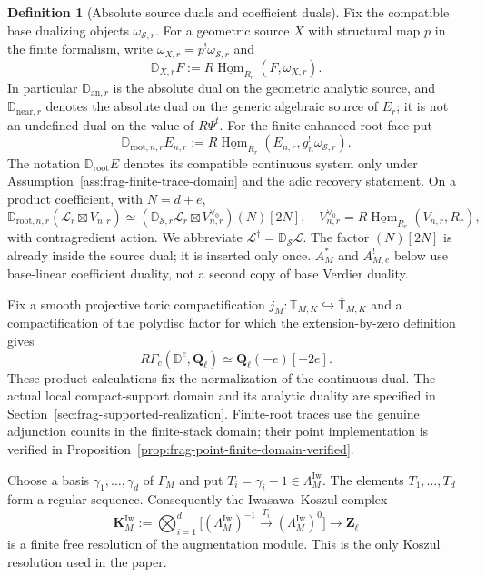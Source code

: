 \documentclass[11pt]{article}
\theoremstyle{definition}
\newtheorem{definition}[theorem]{Definition}
\theoremstyle{remark}
\begin{document}
\begin{definition}[Absolute source duals and coefficient duals]
\label{def:frag-source-duality-ledger}
Fix the compatible base dualizing objects $\omega_{\mathscr S,r}$.
For a geometric source $X$ with structural map $p$ in the finite formalism,
write $\omega_{X,r}=p^!\omega_{\mathscr S,r}$ and
\[
\mathbb D_{X,r}F:=R\underline{\operatorname{Hom}}_{R_r}
(F,\omega_{X,r}).
\]
In particular $\mathbb D_{\mathrm{an},r}$ is the absolute dual on the
geometric analytic source, and $\mathbb D_{\mathrm{near},r}$ denotes the
absolute dual on the generic algebraic source of $E_r$; it is not an
undefined dual on the value of $R\Psi^t$.
For the finite enhanced root face put
\[
\mathbb D_{\mathrm{root},n,r}E_{n,r}
:=R\underline{\operatorname{Hom}}_{R_r}
(E_{n,r},g_n^!\omega_{\mathscr S,r}).
\]
The notation $\mathbb D_{\mathrm{root}}E$ denotes its compatible continuous
system only under Assumption~\ref{ass:frag-finite-trace-domain} and the adic
recovery statement.  On a product coefficient, with $N=d+e$,
\[
\mathbb D_{\mathrm{root},n,r}(\mathcal L_r\boxtimes V_{n,r})
\simeq (\mathbb D_{\mathscr S,r}\mathcal L_r\boxtimes
V_{n,r}^{\vee_0})(N)[2N],
\quad V_{n,r}^{\vee_0}=R\underline{\operatorname{Hom}}_{R_r}(V_{n,r},R_r),
\]
with contragredient action.  We abbreviate
$\mathcal L^\dagger=\mathbb D_{\mathscr S}\mathcal L$.
The factor $(N)[2N]$ is already inside the source dual; it is inserted only
once.  $A_M^*$ and $A_{M,e}^!$ below use base-linear coefficient duality,
not a second copy of base Verdier duality.
\end{definition}


Fix a smooth projective toric compactification
$j_M:\mathbb T_{M,K}\hookrightarrow\overline{\mathbb T}_{M,K}$ and a
compactification of the polydisc factor for which the extension-by-zero
definition gives
\[
 R\Gamma_c(\mathbb D^e,\mathbf Q_\ell)
 \simeq \mathbf Q_\ell(-e)[-2e].
\]
These product calculations fix the normalization of the continuous dual.
The actual local compact-support domain and its analytic duality are
specified in Section~\ref{sec:frag-supported-realization}.  Finite-root
traces use the genuine adjunction counits in the finite-stack domain;
their point implementation is verified in
Proposition~\ref{prop:frag-point-finite-domain-verified}.

Choose a basis $\gamma_1,\ldots,\gamma_d$ of $\Gamma_M$ and put
$T_i=\gamma_i-1\in\Lambda_M^{\mathrm{Iw}}$.  The elements
$T_1,\ldots,T_d$ form a regular sequence.  Consequently the Iwasawa--Koszul
complex
\begin{equation}
 \mathbf K_M^{\mathrm{Iw}}
 :=\bigotimes_{i=1}^{d}
 \bigl[(\Lambda_M^{\mathrm{Iw}})^{-1}
       \xrightarrow{\,T_i\,}(\Lambda_M^{\mathrm{Iw}})^0\bigr]
 \longrightarrow \mathbf Z_\ell
 \label{eq:frag-iwasawa-koszul}
\end{equation}
is a finite free resolution of the augmentation module.  This is the only
Koszul resolution used in the paper.
\end{document}
